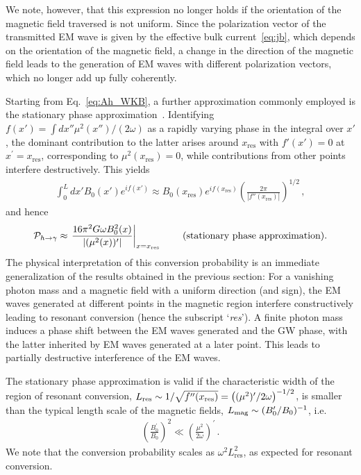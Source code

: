 \documentclass[a4paper,11pt]{article}
\begin{document}
We note, however, that this expression no longer holds if the orientation of the magnetic field traversed is not uniform.
%
Since the polarization vector of the transmitted EM wave is given by the effective bulk current~\eqref{eq:jb}, which depends on the orientation of the magnetic field, a change in the direction of the magnetic field leads to the generation of EM waves with different polarization vectors, which no longer add up fully coherently. 





Starting from Eq.~\eqref{eq:Ah_WKB}, a further approximation commonly employed is the stationary phase approximation~\cite{Hook:2018iia,McDonald:2024nxj,Long:2024qvd}. Identifying $f(x') = \int dx'' \mu^2(x'')/(2 \omega)$ as a rapidly varying phase in the integral over $x'$, the dominant contribution to the latter arises around $x_\text{res}$ with $f'(x') = 0$ at $x^{\prime} = x_\text{res}$, corresponding to $\mu^2(x_\text{res}) = 0$, while contributions from other points interfere destructively.
%
This yields
\begin{align}
  \int_0^L dx' B_0(x') e^{ i f(x')} \approx B_0(x_\text{res})  e^{ i f(x_\text{res})} \left( \frac{2 \pi}{|f''(x_\text{res})|} \right)^{1/2} \,,
\end{align}
and hence
\begin{align}
    \mathcal{P}_{h \rightarrow \gamma} \approx \left. 
    \frac{ 16 \pi^{2} G \omega B_{0}^{2} (x) }{ \vert (\mu^{2}(x))^{\prime}\vert } \right\vert_{x = x_{\rm res}}  \,  \qquad (\text{stationary phase approximation}) .
    \label{eq:saddle_point_approx}
\end{align}
%
The physical interpretation of this conversion probability is an immediate generalization of the results obtained in the previous section: For a vanishing photon mass and a magnetic field with a uniform direction (and sign), the EM waves generated at different points in the magnetic region interfere constructively leading to resonant conversion (hence the subscript `\emph{res}').
%
A finite photon mass induces a phase shift between the EM waves generated and the GW phase, with the latter inherited by EM waves generated at a later point.
%
This leads to partially destructive interference of the EM waves.



The stationary phase approximation is valid if the characteristic width of the region of resonant conversion, $ L_{\rm res} \sim 1 / \sqrt{ f^{\prime\prime} (x_{\rm res}) } =  \left( (\mu^{2})^{\prime} / 2\omega \right)^{-1/2} $, is smaller than the typical length scale of the magnetic fields, $ L_{\rm mag} \sim (B_{0}^{\prime} / B_{0})^{-1} $, i.e.
%
\begin{align}
    \left( \frac{B_{0}^{\prime}}{B_{0}} \right)^{2} \ll \left( \frac{\mu^{2}}{2 \omega} \right)^{\prime} \,.
    \label{eq:adiabativity_magnetic_field}
\end{align}
%
We note that the conversion probability scales as $\omega^2 L_\text{res}^2$, as expected for resonant conversion. 
%
\end{document}

